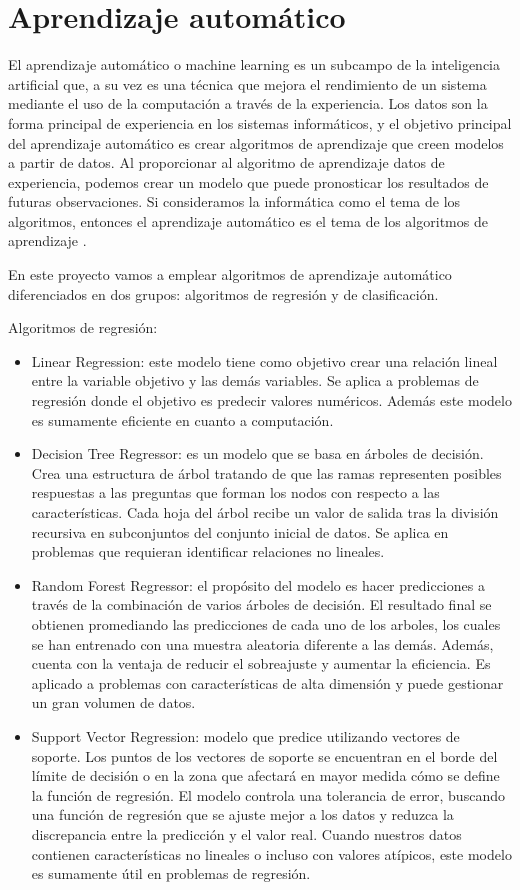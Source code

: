 \section{Aprendizaje automático}

El aprendizaje automático o machine learning es un subcampo de la inteligencia artificial que, a su vez es una técnica que mejora el rendimiento de un sistema mediante el uso de la computación a través de la experiencia. Los datos son la forma principal de experiencia en los sistemas informáticos, y el objetivo principal del aprendizaje automático es crear algoritmos de aprendizaje que creen modelos a partir de datos. Al proporcionar al algoritmo de aprendizaje datos de experiencia, podemos crear un modelo que puede pronosticar los resultados de futuras observaciones. Si consideramos la informática como el tema de los algoritmos, entonces el aprendizaje automático es el tema de los algoritmos de aprendizaje \cite{machinelearning}.

En este proyecto vamos a emplear algoritmos de aprendizaje automático diferenciados en dos grupos: algoritmos de regresión y de clasificación.

Algoritmos de regresión:

\begin{itemize} \label{algoritmosreg}
    \item Linear Regression: este modelo tiene como objetivo crear una relación lineal entre la variable objetivo y las demás variables. Se aplica a problemas de regresión donde el objetivo es predecir valores numéricos. Además este modelo es sumamente eficiente en cuanto a computación.
    \item Decision Tree Regressor: es un modelo que se basa en árboles de decisión. Crea una estructura de árbol tratando de que las ramas representen posibles respuestas a las preguntas que forman los nodos con respecto a las características. Cada hoja del árbol recibe un valor de salida tras la división recursiva en subconjuntos del conjunto inicial de datos. Se aplica en problemas que requieran identificar relaciones no lineales.
    \item Random Forest Regressor: el propósito del modelo es hacer predicciones a través de la combinación de varios árboles de decisión. El resultado final se obtienen promediando las predicciones de cada uno de los arboles, los cuales se han entrenado con una muestra aleatoria diferente a las demás. Además, cuenta con la ventaja de reducir el sobreajuste y aumentar la eficiencia. Es aplicado a problemas con características de alta dimensión y puede gestionar un gran volumen de datos.
    \item Support Vector Regression: modelo que predice utilizando vectores de soporte. Los puntos de los vectores de soporte se encuentran en el borde del límite de decisión o en la zona que afectará en mayor medida cómo se define la función de regresión. El modelo controla una tolerancia de error, buscando una función de regresión que se ajuste mejor a los datos y reduzca la discrepancia entre la predicción y el valor real. Cuando nuestros datos contienen características no lineales o incluso con valores atípicos, este modelo es sumamente útil en problemas de regresión.
\end{itemize}


